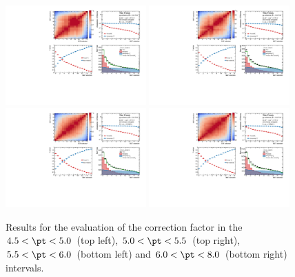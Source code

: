 \begin{figure}
    \centering
    \includegraphics[width=0.48\textwidth]{Figures/Chapter 6/AllPropmtFracs/Ds/DsPromptFrac45_50.pdf}
    \includegraphics[width=0.48\textwidth]{Figures/Chapter 6/AllPropmtFracs/Ds/DsPromptFrac50_55.pdf}
    \includegraphics[width=0.48\textwidth]{Figures/Chapter 6/AllPropmtFracs/Ds/DsPromptFrac55_60.pdf}
    \includegraphics[width=0.48\textwidth]{Figures/Chapter 6/AllPropmtFracs/Ds/DsPromptFrac60_80.pdf}
    \caption{Results for the evaluation of the \fpds correction factor in the $4.5 < \pt < 5.0$~\gevc (top left), $5.0 < \pt < 5.5$~\gevc (top right), $5.5 < \pt < 6.0$~\gevc (bottom left) and $6.0 < \pt < 8.0$~\gevc (bottom right) intervals.}
\end{figure}

